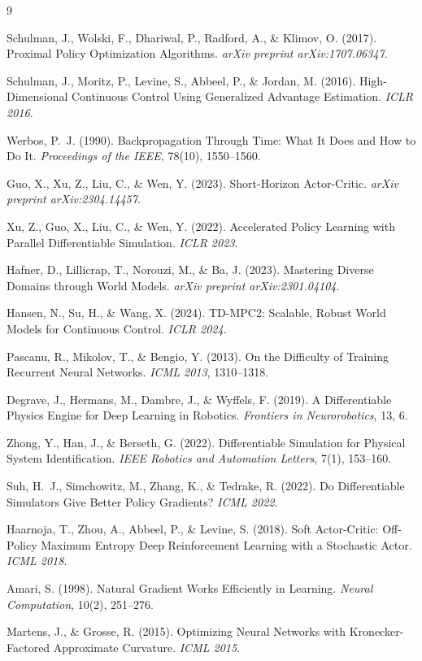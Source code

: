\documentclass[11pt,a4paper]{article}
\begin{document}
\begin{thebibliography}{9}

  Schulman, J., Wolski, F., Dhariwal, P., Radford, A., \& Klimov, O. (2017).
  Proximal Policy Optimization Algorithms.
  \textit{arXiv preprint arXiv:1707.06347}.

  Schulman, J., Moritz, P., Levine, S., Abbeel, P., \& Jordan, M. (2016).
  High-Dimensional Continuous Control Using Generalized Advantage Estimation.
  \textit{ICLR 2016}.

  Werbos, P.~J. (1990).
  Backpropagation Through Time: What It Does and How to Do It.
  \textit{Proceedings of the IEEE}, 78(10), 1550--1560.

  Guo, X., Xu, Z., Liu, C., \& Wen, Y. (2023).
  Short-Horizon Actor-Critic.
  \textit{arXiv preprint arXiv:2304.14457}.

  Xu, Z., Guo, X., Liu, C., \& Wen, Y. (2022).
  Accelerated Policy Learning with Parallel Differentiable Simulation.
  \textit{ICLR 2023}.

  Hafner, D., Lillicrap, T., Norouzi, M., \& Ba, J. (2023).
  Mastering Diverse Domains through World Models.
  \textit{arXiv preprint arXiv:2301.04104}.

  Hansen, N., Su, H., \& Wang, X. (2024).
  TD-MPC2: Scalable, Robust World Models for Continuous Control.
  \textit{ICLR 2024}.

  Pascanu, R., Mikolov, T., \& Bengio, Y. (2013).
  On the Difficulty of Training Recurrent Neural Networks.
  \textit{ICML 2013}, 1310--1318.

  Degrave, J., Hermans, M., Dambre, J., \& Wyffels, F. (2019).
  A Differentiable Physics Engine for Deep Learning in Robotics.
  \textit{Frontiers in Neurorobotics}, 13, 6.

  Zhong, Y., Han, J., \& Berseth, G. (2022).
  Differentiable Simulation for Physical System Identification.
  \textit{IEEE Robotics and Automation Letters}, 7(1), 153--160.

  Suh, H.~J., Simchowitz, M., Zhang, K., \& Tedrake, R. (2022).
  Do Differentiable Simulators Give Better Policy Gradients?
  \textit{ICML 2022}.

  Haarnoja, T., Zhou, A., Abbeel, P., \& Levine, S. (2018).
  Soft Actor-Critic: Off-Policy Maximum Entropy Deep Reinforcement Learning with a Stochastic Actor.
  \textit{ICML 2018}.

  Amari, S. (1998).
  Natural Gradient Works Efficiently in Learning.
  \textit{Neural Computation}, 10(2), 251--276.

  Martens, J., \& Grosse, R. (2015).
  Optimizing Neural Networks with Kronecker-Factored Approximate Curvature.
  \textit{ICML 2015}.

\end{thebibliography}
\end{document}
